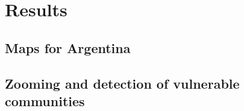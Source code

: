\section{Results}
\subsection{Maps for Argentina}
\subsection{Zooming and detection of vulnerable communities}

